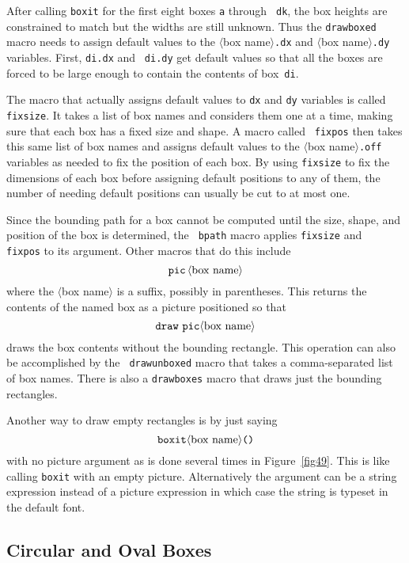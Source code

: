 \documentclass{article} %
\newcommand\descr[1]{{\langle\hbox{#1}\rangle}}
\newcommand\invisgap{\nobreak\hskip0pt\relax}
\newcommand\tdescr[1]{$\langle$\invisgap#1\invisgap$\rangle$}
\begin{document}
After calling {\tt boxit} for the first eight boxes {\tt a} through {\tt
dk}, the box heights are constrained to match but the widths are still
unknown.  Thus the {\tt drawboxed}
macro needs to assign default values to the \tdescr{box name}{\tt.dx}
and \tdescr{box name}{\tt.dy} variables.  First, {\tt di.dx} and {\tt
di.dy} get default values so that all the boxes are forced to be large
enough to contain the contents of box~{\tt di}.

The macro that actually assigns default values to {\tt dx} and {\tt dy}
variables is called {\tt
fixsize}\label{Dfixsiz}.  It takes a
list of box names and considers them one at a time, making sure that
each box has a fixed size and shape.  A macro called {\tt
fixpos}\label{Dfixpos} then takes this
same list of box names and assigns default values to the \tdescr{box
name}{\tt.off} variables as needed to fix the position of each box.  By
using {\tt fixsize} to fix the dimensions of each box before assigning
default positions to any of them, the number of needing default
positions can usually be cut to at most one.

Since the bounding path for a box cannot be computed until the size,
shape, and position of the box is determined, the {\tt
bpath} macro applies {\tt fixsize} and {\tt
fixpos} to its argument.  Other macros that do this
include\label{Dpic}
$$ {\tt pic}\, \descr{box name} $$
where the \tdescr{box name} is a suffix, possibly in parentheses.  This returns
the contents of the named box as a picture positioned so that
$$ {\tt draw\ pic} \descr{box name} $$
draws the box contents without the bounding rectangle.  This operation
can also be accomplished by the {\tt
drawunboxed}\label{Ddrunbx}
macro that takes a comma-separated list of box names.  There is also a
{\tt drawboxes}\label{Ddrbxes} macro
that draws just the bounding rectangles.

Another way to draw empty rectangles is by just saying\label{Deboxit}
$$ {\tt boxit} \descr{box name} \hbox{\tt ()} $$
with no picture argument as is done several times in Figure~\ref{fig49}.
This is like calling {\tt boxit} with an empty picture.
Alternatively the argument can be a string\label{Dsboxit} expression
instead of a picture
expression in which case the string is typeset in the default font.


\subsection{Circular and Oval Boxes}
\end{document}
